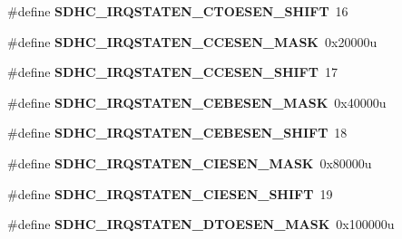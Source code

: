 \begin{DoxyCompactItemize}
\item 
\#define {\bfseries S\+D\+H\+C\+\_\+\+I\+R\+Q\+S\+T\+A\+T\+E\+N\+\_\+\+C\+T\+O\+E\+S\+E\+N\+\_\+\+S\+H\+I\+FT}~16\hypertarget{group__SDHC__Register__Masks_gae43f3a8fe91869f92453ef67ea0f4764}{}\label{group__SDHC__Register__Masks_gae43f3a8fe91869f92453ef67ea0f4764}

\item 
\#define {\bfseries S\+D\+H\+C\+\_\+\+I\+R\+Q\+S\+T\+A\+T\+E\+N\+\_\+\+C\+C\+E\+S\+E\+N\+\_\+\+M\+A\+SK}~0x20000u\hypertarget{group__SDHC__Register__Masks_gab4c7b840945f9d7fbc1912e6b210ab77}{}\label{group__SDHC__Register__Masks_gab4c7b840945f9d7fbc1912e6b210ab77}

\item 
\#define {\bfseries S\+D\+H\+C\+\_\+\+I\+R\+Q\+S\+T\+A\+T\+E\+N\+\_\+\+C\+C\+E\+S\+E\+N\+\_\+\+S\+H\+I\+FT}~17\hypertarget{group__SDHC__Register__Masks_ga373ff5b200a397f6c4a71a9e831ee6c8}{}\label{group__SDHC__Register__Masks_ga373ff5b200a397f6c4a71a9e831ee6c8}

\item 
\#define {\bfseries S\+D\+H\+C\+\_\+\+I\+R\+Q\+S\+T\+A\+T\+E\+N\+\_\+\+C\+E\+B\+E\+S\+E\+N\+\_\+\+M\+A\+SK}~0x40000u\hypertarget{group__SDHC__Register__Masks_gadb32296ea39bd0cd1cd2d5719365c49a}{}\label{group__SDHC__Register__Masks_gadb32296ea39bd0cd1cd2d5719365c49a}

\item 
\#define {\bfseries S\+D\+H\+C\+\_\+\+I\+R\+Q\+S\+T\+A\+T\+E\+N\+\_\+\+C\+E\+B\+E\+S\+E\+N\+\_\+\+S\+H\+I\+FT}~18\hypertarget{group__SDHC__Register__Masks_ga72fbf9bf13c5e322d4671010c7719927}{}\label{group__SDHC__Register__Masks_ga72fbf9bf13c5e322d4671010c7719927}

\item 
\#define {\bfseries S\+D\+H\+C\+\_\+\+I\+R\+Q\+S\+T\+A\+T\+E\+N\+\_\+\+C\+I\+E\+S\+E\+N\+\_\+\+M\+A\+SK}~0x80000u\hypertarget{group__SDHC__Register__Masks_gaa59f05865a6f6434fd4fcf216a4d522a}{}\label{group__SDHC__Register__Masks_gaa59f05865a6f6434fd4fcf216a4d522a}

\item 
\#define {\bfseries S\+D\+H\+C\+\_\+\+I\+R\+Q\+S\+T\+A\+T\+E\+N\+\_\+\+C\+I\+E\+S\+E\+N\+\_\+\+S\+H\+I\+FT}~19\hypertarget{group__SDHC__Register__Masks_ga5db5c25cea330a48bbd4e8439f6eca8d}{}\label{group__SDHC__Register__Masks_ga5db5c25cea330a48bbd4e8439f6eca8d}

\item 
\#define {\bfseries S\+D\+H\+C\+\_\+\+I\+R\+Q\+S\+T\+A\+T\+E\+N\+\_\+\+D\+T\+O\+E\+S\+E\+N\+\_\+\+M\+A\+SK}~0x100000u\hypertarget{group__SDHC__Register__Masks_ga6e36dd46b6990b4b754e5510d1aa2186}{}\label{group__SDHC__Register__Masks_ga6e36dd46b6990b4b754e5510d1aa2186}


\end{DoxyCompactItemize}
